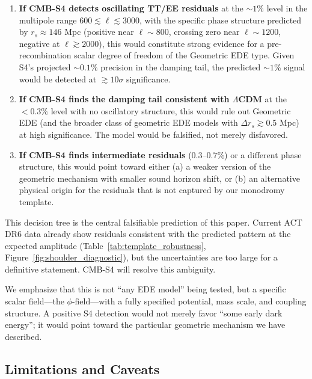 \documentclass[a4paper,11pt]{article}
\begin{document}
\begin{enumerate}
    \item \textbf{If CMB-S4 detects oscillating TT/EE residuals} at the $\sim 1\%$ level in the multipole range $600 \lesssim \ell \lesssim 3000$, with the specific phase structure predicted by $r_s \approx 146$ Mpc (positive near $\ell \sim 800$, crossing zero near $\ell \sim 1200$, negative at $\ell \gtrsim 2000$), this would constitute strong evidence for a pre-recombination scalar degree of freedom of the Geometric EDE type. Given S4's projected $\sim 0.1\%$ precision in the damping tail, the predicted $\sim 1\%$ signal would be detected at $\gtrsim 10\sigma$ significance.
    
    \item \textbf{If CMB-S4 finds the damping tail consistent with $\Lambda$CDM} at the $< 0.3\%$ level with no oscillatory structure, this would rule out Geometric EDE (and the broader class of geometric EDE models with $\Delta r_s \gtrsim 0.5$ Mpc) at high significance. The model would be falsified, not merely disfavored.
    
    \item \textbf{If CMB-S4 finds intermediate residuals} ($0.3$--$0.7\%$) or a different phase structure, this would point toward either (a) a weaker version of the geometric mechanism with smaller sound horizon shift, or (b) an alternative physical origin for the residuals that is not captured by our monodromy template.
\end{enumerate}

This decision tree is the central falsifiable prediction of this paper. Current ACT DR6 data already show residuals consistent with the predicted pattern at the expected amplitude (Table~\ref{tab:template_robustness}, Figure~\ref{fig:shoulder_diagnostic}), but the uncertainties are too large for a definitive statement. CMB-S4 will resolve this ambiguity.

We emphasize that this is not ``any EDE model'' being tested, but a specific scalar field---the $\phi$-field---with a fully specified potential, mass scale, and coupling structure. A positive S4 detection would not merely favor ``some early dark energy''; it would point toward the particular geometric mechanism we have described.

\subsection*{Limitations and Caveats}
\label{sec:limitations}
\end{document}
